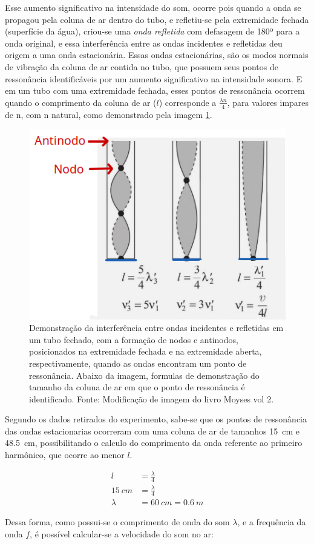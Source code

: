 Esse aumento significativo na intensidade do som, ocorre pois quando a onda se propagou pela coluna de ar dentro do tubo, e refletiu-se pela extremidade fechada (superfície da água), criou-se uma \textit{onda refletida} com defasagem de 180º para a onda original, e essa interferência entre as ondas incidentes e refletidas deu origem a uma onda estacionária. Essas ondas estacionárias, são os modos normais de vibração da coluna de ar contida no tubo, que possuem seus pontos de ressonância identificáveis por um aumento significativo na intensidade sonora. E em um tubo com uma extremidade fechada, esses pontos de ressonância ocorrem quando o comprimento da coluna de ar (\(l\)) corresponde a \(\frac{\lambda n}{4}\), para valores impares de n, com n natural, como demonstrado pela imagem \cref{NodoEAntinodo}. 

\begin{figure}[H]
	\centering
	\includegraphics[width=0.35\linewidth]{fig/NodoEAntinodo.png}
	\caption{Demonstração da interferência entre ondas incidentes e refletidas em um tubo fechado, com a formação de nodos e antinodos, posicionados na extremidade fechada e na extremidade aberta, respectivamente, quando as ondas encontram um ponto de ressonância. Abaixo da imagem, formulas de demonstração do tamanho da coluna de ar em que o ponto de ressonância é identificado. Fonte: Modificação de imagem do livro Moyses vol 2.}
	\label{NodoEAntinodo}
\end{figure}

Segundo os dados retirados do experimento, sabe-se que os pontos de ressonância das ondas estacionarias ocorreram com uma coluna de ar de tamanhos \qty{15}{cm} e \qty{48,5}{cm}, possibilitando o calculo do comprimento da onda referente ao primeiro harmônico, que ocorre ao menor \(l\).

\begin{align*}
	l &= \frac{\lambda}{4}\\
	\qty{15}{cm} &= \frac{ \lambda}{4}\\
	\lambda &= \qty{60}{cm} = \qty{0,6}{m}
\end{align*}

Dessa forma, como possui-se o comprimento de onda do som \(\lambda\), e a frequência da onda \(f\), é possível calcular-se a velocidade do som no ar:

